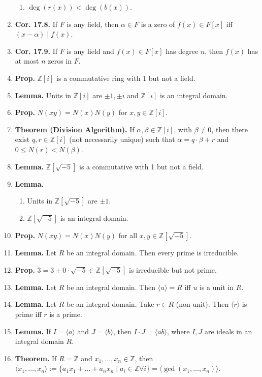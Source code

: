\begin{enumerate}
\begin{enumerate}
		\item $\deg(r(x)) < \deg(b(x))$. 
	\end{enumerate}
	\item \textbf{Cor. 17.8. } If $F$ is any field, then $\alpha \in F$ is a zero of $f(x) \in F[x]$ iff $(x-\alpha) \mid f(x)$. 
	\item \textbf{Cor. 17.9. } If $F$ is any field and $f(x) \in F[x]$ has degree $n$, then $f(x)$ has at most $n$ zeros in $F$. 
	\item \textbf{Prop. } $\mathbb{Z}[i]$ is a commutative ring with 1 but not a field. 	
	\item \textbf{Lemma. } Units in $\mathbb{Z}[i]$ are $\pm 1, \pm i$ and $\mathbb{Z}[i]$ is an integral domain. 	
	\item \textbf{Prop. } $N(xy)=N(x)N(y)$ for $x,y \in \mathbb{Z}[i]$. 
	\item \textbf{Theorem (Division Algorithm). } If $\alpha, \beta \in \mathbb{Z}[i]$, with $\beta \neq 0$, then there exist $q,r \in \mathbb{Z}[i]$ (not necessarily unique) such that $\alpha = q \cdot \beta + r$ and $0 \leq N(r) < N(\beta)$. 
	\item \textbf{Lemma. } $\mathbb{Z}[\sqrt{-5}]$ is a commutative with 1 but not a field. 
	\item \textbf{Lemma. } 
	\begin{enumerate}
		\item Units in $\mathbb{Z}[\sqrt{-5}]$ are $\pm 1$. 
		\item $\mathbb{Z}[\sqrt{-5}]$ is an integral domain. 
	\end{enumerate}
	\item \textbf{Prop. } $N(xy) = N(x)N(y)$ for all $x,y \in \mathbb{Z}[\sqrt{-5}]$. 
	\item \textbf{Lemma. } Let $R$ be an integral domain. Then every prime is irreducible. 
	\item \textbf{Prop. } $3 = 3 + 0 \cdot \sqrt{-5} \in \mathbb{Z}[\sqrt{-5}]$ is irreducible but not prime. 
	\item \textbf{Lemma. } Let $R$ be an integral domain. Then $\langle u \rangle = R$ iff $u$ is a unit in $R$. 
	\item \textbf{Lemma. } Let $R$ be an integral domain. Take $r \in R$ (non-unit). Then $\langle r \rangle$ is prime iff $r$ is a prime. 
	\item \textbf{Lemma. } If $I = \langle a \rangle$ and $J = \langle b \rangle$, then $I \cdot J = \langle ab \rangle$, where $I,J$ are ideals in an integral domain $R$. 
	\item \textbf{Theorem. } If $R = \mathbb{Z}$ and $x_1,\dots,x_n \in \mathbb{Z}$, then $\langle x_1,\dots,x_n \rangle := \{a_1x_1 + \dots + a_nx_n \mid a_i \in \mathbb{Z} \forall i\} = \langle \gcd(x_1,\dots,x_n) \rangle$. 

\end{enumerate}
